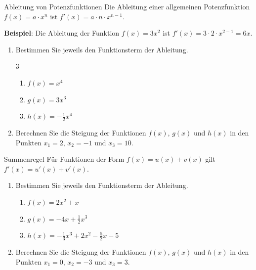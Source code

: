 \documentclass[11pt, a4paper, oneside]{article}
\begin{document}
    \checkered[5cm]

    \begin{hint}{Ableitung von Potenzfunktionen}
        Die Ableitung einer allgemeinen Potenzfunktion $f(x) = a \cdot x^n$ ist
        $f'(x) = a \cdot n \cdot x^{n-1}.$

        \vspace{12pt}
        \textbf{Beispiel}: Die Ableitung der Funktion $f(x) = 3x^2$ ist $f'(x) = 3 \cdot 2 \cdot x^{2-1} = 6x$.
    \end{hint}


    \pagebreak

    \begin{enumerate}[label=\alph*)]
        \item Bestimmen Sie jeweils den Funktionsterm der Ableitung.
        \begin{multicols}{3}
            \begin{enumerate}[label=(\roman*)]
                \item $f(x)=x^4$
                \item $g(x)=3x^3$
                \item $h(x)=-\frac{1}{2}x^4$
            \end{enumerate}
        \end{multicols}

        \item Berechnen Sie die Steigung der Funktionen $f(x)$, $g(x)$ und $h(x)$ in den Punkten $x_1 = 2$, $x_2 = -1$ und $x_3=10$.
    \end{enumerate}

    \checkered[4.5cm]

    
    \begin{hint}{Summenregel}
        Für Funktionen der Form $f(x) = u(x) + v(x)$ gilt $f'(x) = u'(x) + v'(x)$.
    \end{hint}


    \begin{enumerate}[label=\alph*)]
        \item Bestimmen Sie jeweils den Funktionsterm der Ableitung.
        \begin{enumerate}[label=(\roman*)]
            \item $f(x)=2x^2+x$
            \item $g(x)=-4x+\frac{1}{2}x^3$
            \item $h(x)=-\frac{1}{3}x^3+2x^2-\frac{5}{2}x-5$
        \end{enumerate}

        \item Berechnen Sie die Steigung der Funktionen $f(x)$, $g(x)$ und $h(x)$ in den Punkten $x_1 = 0$, $x_2 = -3$ und $x_3=3$.
    \end{enumerate}

    \checkered[4.5cm]

    \let\clearpage\relax
\end{document}
